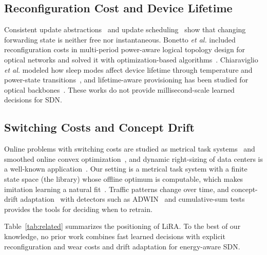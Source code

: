\documentclass[conference]{IEEEtran}
\begin{document}
\subsection{Reconfiguration Cost and Device Lifetime}

Consistent update abstractions~\cite{reitblatt2012abstractions} and update scheduling~\cite{jin2014dionysus} show that changing forwarding state is neither free nor instantaneous. Bonetto \emph{et al.} included reconfiguration costs in multi-period power-aware logical topology design for optical networks and solved it with optimization-based algorithms~\cite{bonetto2013multiperiod}. Chiaraviglio \emph{et al.} modeled how sleep modes affect device lifetime through temperature and power-state transitions~\cite{chiaraviglio2015lifetime,chiaraviglio2014impact}, and lifetime-aware provisioning has been studied for optical backbones~\cite{wiatr2016lifetime}. These works do not provide millisecond-scale learned decisions for SDN.

\subsection{Switching Costs and Concept Drift}

Online problems with switching costs are studied as metrical task systems~\cite{borodin1992mts} and smoothed online convex optimization~\cite{chen2018obd}, and dynamic right-sizing of data centers is a well-known application~\cite{lin2013rightsizing}. Our setting is a metrical task system with a finite state space (the library) whose offline optimum is computable, which makes imitation learning a natural fit~\cite{ross2011dagger}. Traffic patterns change over time, and concept-drift adaptation~\cite{gama2014drift,lu2019drift} with detectors such as ADWIN~\cite{bifet2007adwin} and cumulative-sum tests~\cite{page1954cusum} provides the tools for deciding when to retrain.

Table~\ref{tab:related} summarizes the positioning of LiRA. To the best of our knowledge, no prior work combines fast learned decisions with explicit reconfiguration and wear costs and drift adaptation for energy-aware SDN.
\end{document}
